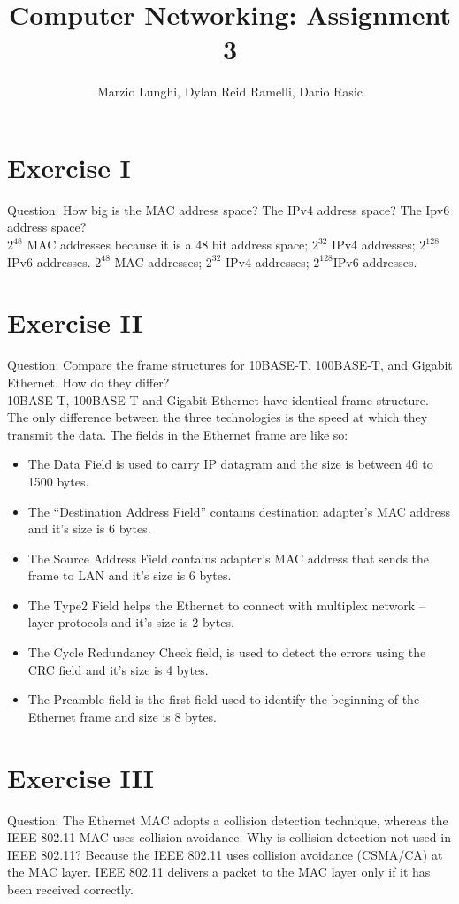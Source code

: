 \documentclass[11pt]{article}
\title{Computer Networking: Assignment 3}
\author{Marzio Lunghi, Dylan Reid Ramelli, Dario Rasic}
\begin{document}
	\maketitle
	\newpage
	\section*{Exercise I}
	Question: How big is the MAC address space? The IPv4 address space? The Ipv6 address space?\\
	$2^{48}$ MAC addresses because it is a 48 bit address space; $2^{32}$ IPv4 addresses; $2^{128}$IPv6 addresses.
	\linebreak
	$2^{48}$ MAC addresses; $2^{32}$ IPv4 addresses; $2^{128}$IPv6 addresses.
	\section*{Exercise II}
	Question: Compare the frame structures for 10BASE-T, 100BASE-T,
	and Gigabit Ethernet. How do they differ?\\
	\linebreak
	10BASE-T, 100BASE-T and Gigabit Ethernet have identical frame structure.
	The only difference between the three technologies is the speed at which they transmit the data.
	The fields in the Ethernet frame are like so:
	\begin{itemize}
		\item The Data Field is used to carry IP datagram and the size is between 46 to 1500 bytes.
		\item 	The “Destination Address Field” contains destination adapter’s MAC address and it's size is 6 bytes.
		\item 	The Source Address Field contains adapter’s MAC address that sends the frame to LAN and it's size is 6 bytes.
		\item 	The Type2 Field helps the Ethernet to connect with multiplex network – layer protocols and it's size is 2 bytes.
		\item The Cycle Redundancy Check field, is used to detect the errors using the CRC field and it's size is 4 bytes.
		\item 	The Preamble field is the first field used to identify the beginning of the Ethernet frame and size is 8 bytes.
	\end{itemize}

	\section*{Exercise III}
	Question: The Ethernet MAC adopts a collision detection technique, whereas the IEEE 802.11 MAC uses collision avoidance. Why is collision detection not used in IEEE 802.11?
	\linebreak
	Because the IEEE 802.11 uses collision avoidance (CSMA/CA) at the MAC layer. IEEE 802.11 delivers a packet to the MAC layer only if it has been received correctly.
\end{document}
